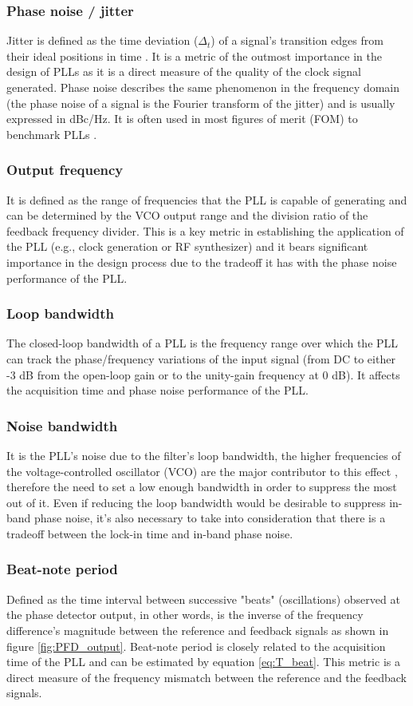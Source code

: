 \subsubsection{Phase noise / jitter}
Jitter is defined as the time deviation ($\Delta_t$) of a signal's transition edges from their ideal positions in time \cite{PengLi2001}. It is a metric of the outmost importance in the design of PLLs 
as it is a direct measure of the quality of the clock signal generated. Phase noise describes the same phenomenon in the frequency domain (the phase noise of a signal is the Fourier 
transform of the jitter) and is usually expressed in dBc/Hz. It is often used in most figures of merit (FOM) to benchmark PLLs \cite{Bae_jitterFOM_2022}.
\subsubsection{Output frequency}
It is defined as the range of frequencies that the PLL is capable of generating and can be determined by the VCO output range and the division ratio of the feedback frequency divider. This
is a key metric in establishing the application of the PLL (e.g., clock generation or RF synthesizer) and it bears significant importance in the design process due to the tradeoff 
it has with the phase noise performance of the PLL.
\subsubsection{Loop bandwidth}
The closed-loop bandwidth of a PLL is the frequency range over which the PLL can track the phase/frequency variations of the input signal 
(from DC to either -3 dB from the open-loop gain or to the unity-gain frequency at 0 dB). It affects the acquisition time and phase noise 
performance of the PLL.
\subsubsection{Noise bandwidth}
It is the PLL's noise due to the filter's loop bandwidth, the higher frequencies of the voltage-controlled oscillator (VCO) are the major
contributor to this effect \cite{Razavi_analogDesign_book}, therefore the need to set a low enough bandwidth in order to suppress the most out of it. Even if reducing the loop
bandwidth would be desirable to suppress in-band phase noise, it's also necessary to take into consideration that there is a tradeoff between the
lock-in time and in-band phase noise.
\subsubsection{Beat-note period}
Defined as the time interval between successive "beats" (oscillations) observed at the phase detector output, in other words, is the inverse of
the frequency difference's magnitude between the reference and feedback signals as shown in figure \ref{fig:PFD_output}. Beat-note period is closely related to the acquisition time of the
PLL and can be estimated by equation \eqref{eq:T_beat}. This metric is a direct measure of the frequency mismatch between the reference and
the feedback signals.

